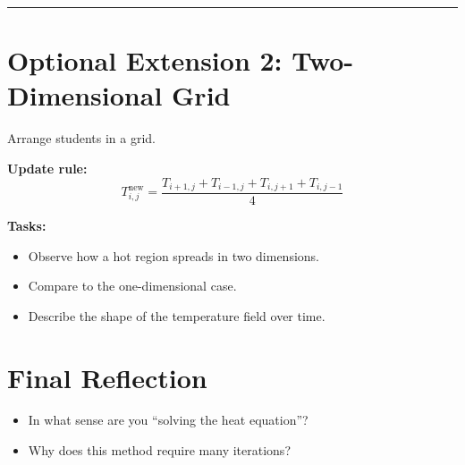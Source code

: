 \documentclass[11pt,a4paper]{article}
\begin{document}
\bigskip
\hrule
\bigskip

\section*{Optional Extension 2: Two-Dimensional Grid}

Arrange students in a grid.

\textbf{Update rule:}
\begin{equation}
T_{i,j}^{\text{new}} =
\frac{
T_{i+1,j} + T_{i-1,j} + T_{i,j+1} + T_{i,j-1}
}{4}
\end{equation}

\textbf{Tasks:}
\begin{itemize}
    \item Observe how a hot region spreads in two dimensions.
    \item Compare to the one-dimensional case.
    \item Describe the shape of the temperature field over time.
\end{itemize}

\section*{Final Reflection}

\begin{itemize}
    \item In what sense are you “solving the heat equation”?
    \item Why does this method require many iterations?
\end{itemize}
\end{document}
